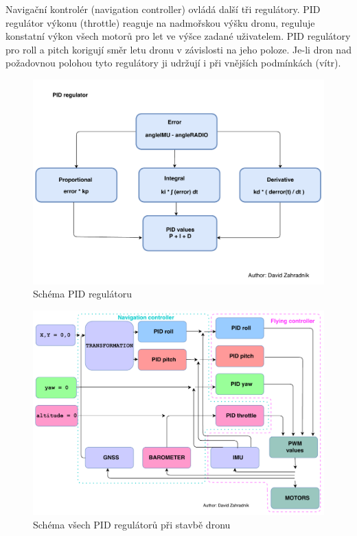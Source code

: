 Navigační kontrolér (navigation controller) ovládá další tři regulátory. PID regulátor výkonu (throttle) reaguje na nadmořskou výšku dronu, reguluje konstatní výkon všech motorů pro let ve výšce zadané uživatelem. PID regulátory pro roll a pitch korigují směr letu dronu v závislosti na jeho poloze. Je-li dron nad požadovnou polohou tyto regulátory ji udržují i při vnějších podmínkách (vítr).\cite{pid} \cite{hacksterpid}\\
\begin{figure}[H]
	\centering
	\includegraphics[width=15cm]{pictures/PIDDiagram.pdf}
	\caption{Schéma PID regulátoru}
\end{figure}

\begin{figure}[H]
	\centering
	\includegraphics[width=15cm]{pictures/PIDsDiagram.pdf}
	\caption{Schéma všech PID regulátorů při stavbě dronu}
\end{figure}


